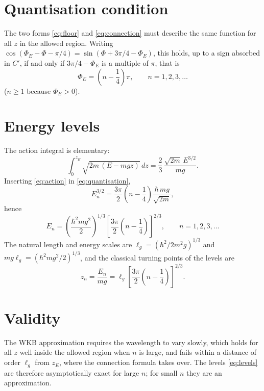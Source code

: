 \documentclass{article}
\begin{document}
\section{Quantisation condition}
The two forms \eqref{eq:floor} and \eqref{eq:connection} must describe the same function for all $z$ in the allowed region. Writing $\cos(\Phi_E - \Phi - \pi/4) = \sin(\Phi + 3\pi/4 - \Phi_E)$, this holds, up to a sign absorbed in $C'$, if and only if $3\pi/4 - \Phi_E$ is a multiple of $\pi$, that is
\begin{equation}
  \Phi_E = \left(n - \frac14\right)\pi, \qquad n = 1, 2, 3, \dots
  \label{eq:quantisation}
\end{equation}
($n \ge 1$ because $\Phi_E > 0$).

\section{Energy levels}
The action integral is elementary:
\begin{equation}
  \int_0^{z_E} \sqrt{2m\,(E - mgz)}\,dz = \frac{2}{3}\,\frac{\sqrt{2m}\,E^{3/2}}{mg} .
  \label{eq:action}
\end{equation}
Inserting \eqref{eq:action} in \eqref{eq:quantisation},
\begin{equation}
  E_n^{3/2} = \frac{3\pi}{2}\left(n - \frac14\right)\frac{\hbar\, mg}{\sqrt{2m}} ,
  \label{eq:E32}
\end{equation}
hence
\begin{equation}
  E_n = \left(\frac{\hbar^2 m g^2}{2}\right)^{1/3}\left[\frac{3\pi}{2}\left(n - \frac14\right)\right]^{2/3}, \qquad n = 1, 2, 3, \dots
  \label{eq:levels}
\end{equation}
The natural length and energy scales are $\ell_g = (\hbar^2/2m^2g)^{1/3}$ and $mg\ell_g = (\hbar^2 m g^2/2)^{1/3}$, and the classical turning points of the levels are
\begin{equation}
  z_n = \frac{E_n}{mg} = \ell_g\left[\frac{3\pi}{2}\left(n - \frac14\right)\right]^{2/3} .
  \label{eq:heights}
\end{equation}

\section{Validity}
The WKB approximation requires the wavelength to vary slowly, which holds for all $z$ well inside the allowed region when $n$ is large, and fails within a distance of order $\ell_g$ from $z_E$, where the connection formula takes over. The levels \eqref{eq:levels} are therefore asymptotically exact for large $n$; for small $n$ they are an approximation.
\end{document}

